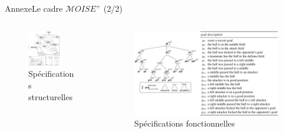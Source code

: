 \begin{frame}{Annexe}{Le cadre $\mathcal{M}OISE^+$ (2/2)}

    \vspace{-2.5ex}

    \begin{columns}
        \hspace{-16ex}
        \begin{column}{0.5\textwidth}
            \centering
            \begin{figure}[H]
                \includegraphics[width=0.7\textwidth]{figures/soccer_ss.png}
                \caption*{Spécifications structurelles}
            \end{figure}
        \end{column}
        \hspace{-20ex}
        \begin{column}{0.5\textwidth}
            \centering
            \begin{figure}[H]
                \centering
                \includegraphics[width=1.2\textwidth]{figures/soccer_fs.png}
                \caption*{Spécifications fonctionnelles}
            \end{figure}
        \end{column}
    \end{columns}


\end{frame}
